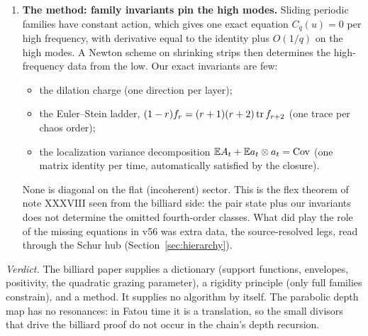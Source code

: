 \begin{enumerate}[leftmargin=*]
non-ellipses. A closure that is exact on isolated states says nothing; exactness on a continuum forces Gaussianity. The first
obstruction is $\kappa_3$, the first odd harmonic of the zonoid.
\item \textbf{The method: family invariants pin the high modes.} Sliding periodic families have constant action, which gives one exact
equation $C_q(u)=0$ per high frequency, with derivative equal to the identity plus $O(1/q)$ on the high modes. A Newton scheme on
shrinking strips then determines the high-frequency data from the low. Our exact invariants are few:
\begin{itemize}
\item the dilation charge (one direction per layer);
\item the Euler--Stein ladder, $(1-r)f_r=(r+1)(r+2)\operatorname{tr} f_{r+2}$ (one trace per chaos order);
\item the localization variance decomposition $\mathbb E A_t+\mathbb E a_t\otimes a_t=\operatorname{Cov}$ (one matrix identity per time, automatically satisfied by the
closure).
\end{itemize}
None is diagonal on the flat (incoherent) sector. This is the flex theorem of note XXXVIII seen from the billiard side: the pair state
plus our invariants does not determine the omitted fourth-order classes. What did play the role of the missing equations in v56 was
extra data, the source-resolved legs, read through the Schur hub (Section~\ref{sec:hierarchy}).
\end{enumerate}
\emph{Verdict.} The billiard paper supplies a dictionary (support functions, envelopes, positivity, the quadratic grazing
parameter), a rigidity principle (only full families constrain), and a method. It supplies no algorithm by itself. The parabolic
depth map has no resonances: in Fatou time it is a translation, so the small divisors that drive the billiard proof do not occur in the
chain's depth recursion.

